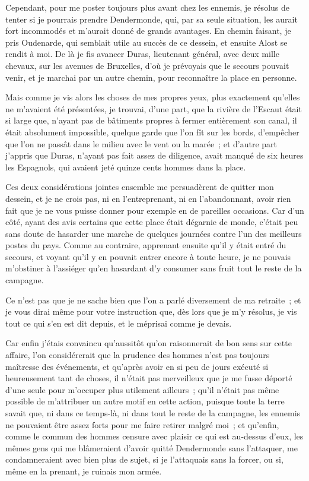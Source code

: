 \documentclass[french,twoside]{book} %
\begin{document}
Cependant, pour me poster toujours plus avant chez les ennemis, je résolus de tenter si je pourrais prendre Dendermonde, qui, par sa seule situation, les aurait fort incommodés et m’aurait donné de grands avantages. En chemin faisant, je pris Oudenarde, qui semblait utile au succès de ce dessein, et ensuite Alost se rendit à moi. De là je fis avancer Duras, lieutenant général, avec deux mille chevaux, sur les avenues de Bruxelles, d’où je prévoyais que le secours pouvait venir, et je marchai par un autre chemin, pour reconnaître la place en personne.\par
Mais comme je vis alors les choses de mes propres yeux, plus exactement qu’elles ne m’avaient été présentées, je trouvai, d’une part, que la rivière de l’Escaut était si large que, n’ayant pas de bâtiments propres à fermer entièrement son canal, il était absolument impossible, quelque garde que l’on fît sur les bords, d’empêcher que l’on ne passât dans le milieu avec le vent ou la marée ; et d’autre part j’appris que Duras, n’ayant pas fait assez de diligence, avait manqué de six heures les Espagnols, qui avaient jeté quinze cents hommes dans la place.\par
Ces deux considérations jointes ensemble me persuadèrent de quitter mon dessein, et je ne crois pas, ni en l’entreprenant, ni en l’abandonnant, avoir rien fait que je ne vous puisse donner pour exemple en de pareilles occasions. Car d’un côté, ayant des avis certains que cette place était dégarnie de monde, c’était peu sans doute de hasarder une marche de quelques journées contre l’un des meilleurs postes du pays. Comme au contraire, apprenant ensuite qu’il y était entré du secours, et voyant qu’il y en pouvait entrer encore à toute heure, je ne pouvais m’obstiner à l’assiéger qu’en hasardant d’y consumer sans fruit tout le reste de la campagne.\par
Ce n’est pas que je ne sache bien que l’on a parlé diversement de ma retraite ; et je vous dirai même pour votre instruction que, dès lors que je m’y résolus, je vis tout ce qui s’en est dit depuis, et le méprisai comme je devais.\par
Car enfin j’étais convaincu qu’aussitôt qu’on raisonnerait de bon sens sur cette affaire, l’on considérerait que la prudence des hommes n’est pas toujours maîtresse des événements, et qu’après avoir en si peu de jours exécuté si heureusement tant de choses, il n’était pas merveilleux que je me fusse déporté d’une seule pour m’occuper plus utilement ailleurs ; qu’il n’était pas même possible de m’attribuer un autre motif en cette action, puisque toute la terre savait que, ni dans ce temps-là, ni dans tout le reste de la campagne, les ennemis ne pouvaient être assez forts pour me faire retirer malgré moi ; et qu’enfin, comme le commun des hommes censure avec plaisir ce qui est au-dessus d’eux, les mêmes gens qui me blâmeraient d’avoir quitté Dendermonde sans l’attaquer, me condamneraient avec bien plus de sujet, si je l’attaquais sans la forcer, ou si, même en la prenant, je ruinais mon armée.\par
\end{document}
